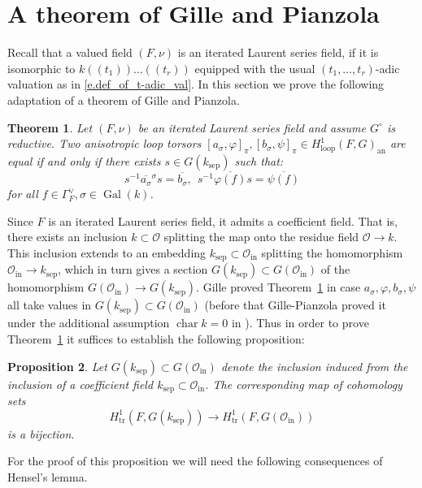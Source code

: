 \documentclass[12pt]{amsart}
\numberwithin{equation}{section}
\newtheorem{theorem}{Theorem}[section]
\newtheorem{proposition}[theorem]{Proposition}
\theoremstyle{definition}
\newcommand{\cO}{\mathcal{O}}
\newcommand{\an}{\operatorname{an}}
\newcommand{\Gal}{\operatorname{Gal}}
\newcommand{\sep}{\operatorname{sep}}
\newcommand{\Char}{\operatorname{char}}
\newcommand{\tr}{\operatorname{tr}}
\newcommand{\ksep}{k_{\sep}}
\newcommand{\oin}{\operatorname{in}}
\newcommand{\Oin}{\cO_{\oin}}
\newcommand{\vphi}{\varphi}
\newcommand{\I}[1]{\Gamma_{#1}^{\vee}}
\newcommand{\lop}{\operatorname{loop}}
\begin{document}
\section{A theorem of Gille and Pianzola}\label{sect.a_theorem_of_GP}
Recall that a valued field $(F,\nu)$ is an iterated Laurent series field, if it is isomorphic to $k(\!(t_1)\!)\dots(\!(t_r)\!)$ equipped with the usual $(t_1,\dots,t_r)$-adic valuation as in \eqref{e.def_of_t-adic_val}.
In this section we prove the following adaptation of a theorem of Gille and Pianzola.

\begin{theorem}\label{thm.uniqueness}
    Let $(F,\nu)$ be an iterated Laurent series field and assume $G^{\circ}$ is reductive. Two anisotropic loop torsors $[a_\sigma,\vphi]_\pi,[b_\sigma,\psi]_\pi \in H^1_{\lop}(F,G)_{\an}$ are equal if and only if there exists $s\in G(\ksep)$ such that:
    \begin{equation}\label{e.28}
    s^{-1} \overline{a_\sigma} {}^\sigma s = \overline{b_\sigma}, \ \ s^{-1} \overline{\vphi(f)} s = \overline{\psi(f)} 
    \end{equation}
    for all $f\in \I{F}, \sigma\in \Gal(k)$.
\end{theorem}

Since $F$ is an iterated Laurent series field, it admits a coefficient field. That is, there exists an inclusion $k\subset \cO$ splitting the map onto the residue field $\cO \to k$. This inclusion extends to an embedding $\ksep \subset \Oin$ splitting the homomorphism $\Oin\to \ksep$, which in turn gives a section $G(\ksep)\subset G(\Oin)$ of the homomorphism $G(\Oin) \to G(\ksep)$.  Gille proved Theorem~\ref{thm.uniqueness} in case $a_\sigma,\vphi,b_\sigma,\psi$ all take values in $G(\ksep)\subset G(\Oin)$ \cite[Corollary 4.11]{gille2024newloop} (before that Gille-Pianzola proved it under the additional assumption $\Char k =0$ in \cite{gille2013torsors}). 
Thus in order to prove Theorem~\ref{thm.uniqueness} it suffices to establish the following proposition:

\begin{proposition}\label{prop.hensel_coeffic_field2}
    Let $G(\ksep)\subset G(\Oin)$ denote the inclusion induced from the inclusion of a coefficient field $\ksep\subset \Oin$. The corresponding map of cohomology sets 
    \begin{equation}\label{e.reduction_map_coh}
        H^1_{\tr}(F,G(\ksep))\to H^1_{\tr}(F,G(\Oin))
    \end{equation} is a bijection. 
\end{proposition}
For the proof of this proposition we will need the following consequences of Hensel's lemma.
\end{document}
